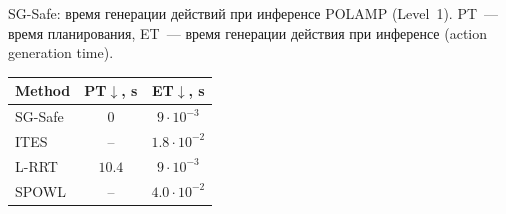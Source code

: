 \begin{frame}[shrink=5,noframenumbering]{SG-Safe: время генерации действий при инференсе}
    \centering
    \scriptsize
    POLAMP (Level~1).
    PT~--- время планирования, ET~--- время генерации действия при инференсе
    (action generation time).

    \vspace{0.35em}
    \begin{tabular}{lcc}
    \toprule
    Method & PT$\downarrow$, s & ET$\downarrow$, s \\
    \midrule
    SG-Safe & $0$ & $9\cdot 10^{-3}$ \\
    ITES & -- & $1.8\cdot 10^{-2}$ \\
    L-RRT & $10.4$ & $9\cdot 10^{-3}$ \\
    SPOWL & -- & $4.0\cdot 10^{-2}$ \\
    \bottomrule
    \end{tabular}
\end{frame}


